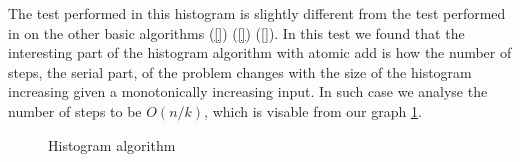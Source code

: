 The test performed in this histogram is slightly different from the test performed in on the other basic algorithms (\cref{}) (\cref{}) (\cref{}).
In this test we found that the interesting part of the histogram algorithm with atomic add is how the number of steps, the serial part, of the problem changes with the size of the histogram increasing given a monotonically increasing input.
In such case we analyse the number of steps to be $O(n/k)$, which is visable from our graph \cref{fig:histogram plot}.

\begin{figure}[htb]
  \centering
    
  \caption{Histogram algorithm}
  \label{fig:histogram plot}
\end{figure}
